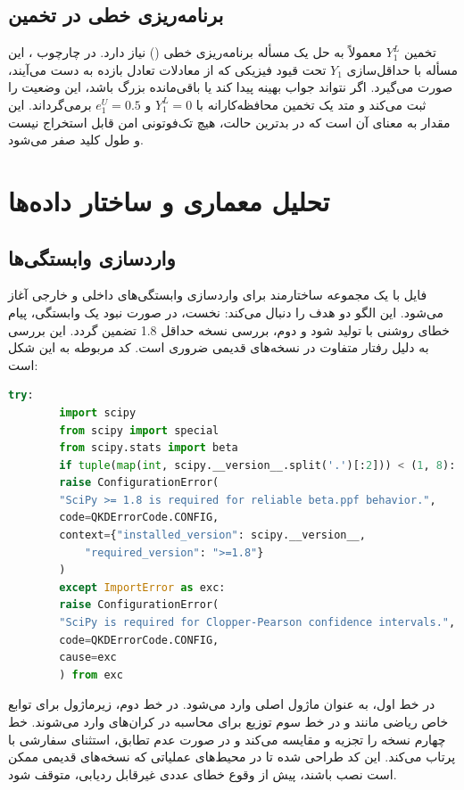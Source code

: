 \subsection{برنامه‌ریزی خطی در تخمین }

تخمین $Y_1^L$ معمولاً به حل یک مسأله برنامه‌ریزی خطی () نیاز دارد. در چارچوب ، این مسأله با حداقل‌سازی $Y_1$ تحت قیود فیزیکی که از معادلات تعادل بازده به دست می‌آیند، صورت می‌گیرد. اگر  نتواند جواب بهینه پیدا کند یا باقی‌مانده  بزرگ باشد،  این وضعیت را ثبت می‌کند و متد  یک تخمین محافظه‌کارانه با $Y_1^L = 0$ و $e_1^U = 0.5$ برمی‌گرداند. این مقدار به معنای آن است که در بدترین حالت، هیچ تک‌فوتونی امن قابل استخراج نیست و طول کلید صفر می‌شود.

\section{تحلیل معماری و ساختار داده‌ها}

\subsection{واردسازی وابستگی‌ها}

فایل با یک مجموعه  ساختارمند برای واردسازی وابستگی‌های داخلی و خارجی آغاز می‌شود. این الگو دو هدف را دنبال می‌کند: نخست، در صورت نبود یک وابستگی، پیام خطای روشنی با  تولید شود و دوم، بررسی نسخه  حداقل 1.8 تضمین گردد. این بررسی به دلیل رفتار متفاوت  در نسخه‌های قدیمی ضروری است. کد مربوطه به این شکل است:

\begin{LTR}
	\begin{lstlisting}[language=Python]
		try:
		import scipy
		from scipy import special
		from scipy.stats import beta
		if tuple(map(int, scipy.__version__.split('.')[:2])) < (1, 8):
		raise ConfigurationError(
		"SciPy >= 1.8 is required for reliable beta.ppf behavior.",
		code=QKDErrorCode.CONFIG,
		context={"installed_version": scipy.__version__,
			"required_version": ">=1.8"}
		)
		except ImportError as exc:
		raise ConfigurationError(
		"SciPy is required for Clopper-Pearson confidence intervals.",
		code=QKDErrorCode.CONFIG,
		cause=exc
		) from exc
	\end{lstlisting}
\end{LTR}

در خط اول،  به عنوان ماژول اصلی وارد می‌شود. در خط دوم، زیرماژول  برای توابع خاص ریاضی مانند  و در خط سوم توزیع  برای محاسبه  در کران‌های  وارد می‌شوند. خط چهارم نسخه را تجزیه و مقایسه می‌کند و در صورت عدم تطابق، استثنای سفارشی با  پرتاب می‌کند. این کد طراحی شده تا در محیط‌های عملیاتی که نسخه‌های قدیمی  ممکن است نصب باشند، پیش از وقوع خطای عددی غیرقابل ردیابی، متوقف شود.

